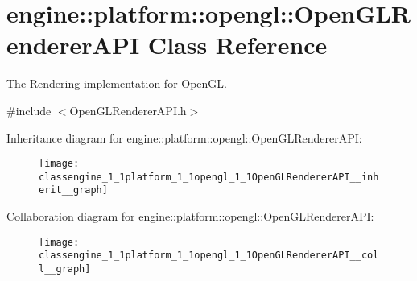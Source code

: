 \hypertarget{classengine_1_1platform_1_1opengl_1_1OpenGLRendererAPI}{}\section{engine\+:\+:platform\+:\+:opengl\+:\+:Open\+G\+L\+Renderer\+A\+PI Class Reference}
\label{classengine_1_1platform_1_1opengl_1_1OpenGLRendererAPI}


The Rendering implementation for Open\+GL.  




{\ttfamily \#include $<$Open\+G\+L\+Renderer\+A\+P\+I.\+h$>$}



Inheritance diagram for engine\+:\+:platform\+:\+:opengl\+:\+:Open\+G\+L\+Renderer\+A\+PI\+:\nopagebreak
\begin{figure}[H]
\begin{center}
\leavevmode
\texttt{[image: classengine\_1\_1platform\_1\_1opengl\_1\_1OpenGLRendererAPI\_\_inherit\_\_graph]}
\end{center}
\end{figure}


Collaboration diagram for engine\+:\+:platform\+:\+:opengl\+:\+:Open\+G\+L\+Renderer\+A\+PI\+:\nopagebreak
\begin{figure}[H]
\begin{center}
\leavevmode
\texttt{[image: classengine\_1\_1platform\_1\_1opengl\_1\_1OpenGLRendererAPI\_\_coll\_\_graph]}
\end{center}
\end{figure}
